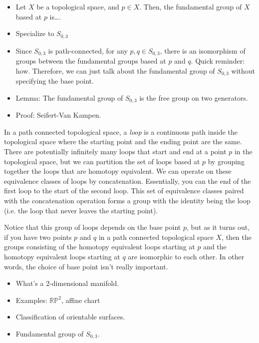 \documentclass{amsart}
\begin{document}
\begin{itemize}
	\item Let $X$ be a topological space, and $p\in X$. Then, the fundamental group of $X$ based at $p$ is\dots.
	\item Specialize to $S_{0,3}$
	\item Since $S_{0,3}$ is path-connected, for any $p,q\in S_{0,3}$, there is an isomorphism of groups between the fundamental groups based at $p$ and $q$. Quick reminder: how. Therefore, we can just talk about the fundamental group of $S_{0,3}$ without specifying the base point.
	\item Lemma: The fundamental group of $S_{0,3}$ is the free group on two generators.
	\item Proof: Seifert-Van Kampen.
\end{itemize}
In a path connected topological space, a \emph{loop} is a continuous path inside the topological space where the starting point and the ending point are the same. There are potentially infinitely many loops that start and end at a point $p$ in the topological space, but we can partition the set of loops based at $p$ by grouping together the loops that are homotopy equivalent. We can operate on these equivalence classes of loops by concatenation. Essentially, you can  the end of the first loop to the start of the second loop. This set of equivalence classes paired with the concatenation operation forms a group with the identity being the  loop (i.e. the loop that never leaves the starting point). 

Notice that this group of loops depends on the base point $p$, but as it turns out, if you have two points $p$ and $q$ in a path connected topological space $X$, then the groups consisting of the homotopy equivalent loops starting at $p$ and the homotopy equivalent loops starting at $q$ are isomorphic to each other. In other words, the choice of base point isn't really important.


\begin{itemize}
    \item What's a 2-dimensional manifold.
    \item Examples: $\mathbb{RP}^2$, affine chart 
    \item Classification of orientable surfaces.
    \item Fundamental group of $S_{0,3}$.
\end{itemize}
\end{document}
